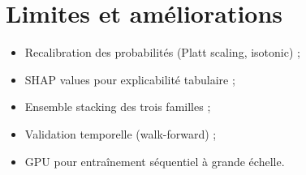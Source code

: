 \section{Limites et améliorations}

\begin{itemize}[leftmargin=*]
  \item Recalibration des probabilités (Platt scaling, isotonic) ;
  \item SHAP values pour explicabilité tabulaire ;
  \item Ensemble stacking des trois familles ;
  \item Validation temporelle (walk-forward) ;
  \item GPU pour entraînement séquentiel à grande échelle.
\end{itemize}
